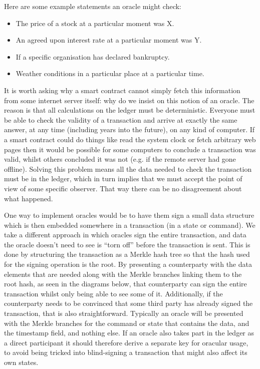 \documentclass{article}
\begin{document}
Here are some example statements an oracle might check:

\begin{itemize}
\item The price of a stock at a particular moment was X.
\item An agreed upon interest rate at a particular moment was Y.
\item If a specific organisation has declared bankruptcy.
\item Weather conditions in a particular place at a particular time.
\end{itemize}

It is worth asking why a smart contract cannot simply fetch this information from some internet server itself: why
do we insist on this notion of an oracle. The reason is that all calculations on the ledger must be deterministic.
Everyone must be able to check the validity of a transaction and arrive at exactly the same answer, at any time
(including years into the future), on any kind of computer. If a smart contract could do things like read the
system clock or fetch arbitrary web pages then it would be possible for some computers to conclude a transaction
was valid, whilst others concluded it was not (e.g. if the remote server had gone offline). Solving this problem
means all the data needed to check the transaction must be in the ledger, which in turn implies that we must accept
the point of view of some specific observer. That way there can be no disagreement about what happened.

One way to implement oracles would be to have them sign a small data structure which is then embedded somewhere in
a transaction (in a state or command). We take a different approach in which oracles sign the entire transaction,
and data the oracle doesn't need to see is ``torn off'' before the transaction is sent. This is done by structuring
the transaction as a Merkle hash tree so that the hash used for the signing operation is the root. By presenting a
counterparty with the data elements that are needed along with the Merkle branches linking them to the root hash,
as seen in the diagrams below, that counterparty can sign the entire transaction whilst only being able to see some
of it. Additionally, if the counterparty needs to be convinced that some third party has already signed the
transaction, that is also straightforward. Typically an oracle will be presented with the Merkle branches for the
command or state that contains the data, and the timestamp field, and nothing else. If an oracle also takes part
in the ledger as a direct participant it should therefore derive a separate key for oracular usage, to avoid 
being tricked into blind-signing a transaction that might also affect its own states.
\end{document}
